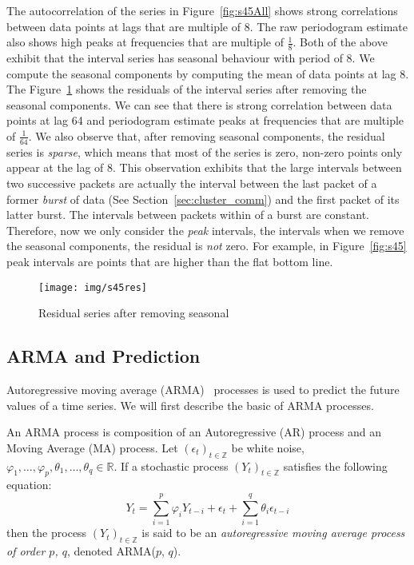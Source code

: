 \documentclass[12pt]{article}
\begin{document}
The autocorrelation of the series in Figure~\ref{fig:s45All} shows strong
correlations between data points at lags that are multiple of 8. The raw
periodogram estimate also shows high peaks at frequencies that are
multiple of $\frac{1}{8}$. Both of the above exhibit that the interval
series has seasonal behaviour with period of 8. We compute the seasonal
components by computing the mean of data points at lag 8. The
Figure~\ref{fig:s45res} shows the residuals of the interval series after
removing the seasonal components. We can see that there is strong correlation
between data points at lag 64 and periodogram estimate peaks at frequencies
that are multiple of $\frac{1}{64}$. We also observe that, after removing
seasonal components, the residual series is \textit{sparse}, which means that
most of the series is zero, non-zero points only appear at the lag of 8. This
observation exhibits that the large intervals between two successive packets are
actually the interval between the last packet of a former \textit{burst} of data
(See Section~\ref{sec:cluster_comm}) and the first packet of its latter burst.
The intervals between packets within of a burst are constant. Therefore, now we
only consider the \textit{peak} intervals, the intervals when we remove
the seasonal components, the residual is \textit{not} zero. For example, in
Figure~\ref{fig:s45} peak intervals are points that are higher than the flat
bottom line.

\begin{figure}[ht!]
\centering
\texttt{[image: img/s45res]}
\caption{Residual series after removing seasonal}\label{fig:s45res}
\end{figure}



\subsection{ARMA and Prediction}
Autoregressive moving average (ARMA)~\cite{BoxTimeSeries, FalkStatSAS}
 processes is used to predict the future values of a time series. We will first
 describe the basic of ARMA processes.
 
 An ARMA process is composition of an Autoregressive (AR) process and an Moving
 Average (MA) process. Let $(\epsilon_t)_{t\in \mathbb{Z}}$ be white noise,
 $\varphi_1, \ldots, \varphi_p, \theta_1, \ldots, \theta_q\in\mathbb{R}$. If a
stochastic process $(Y_t)_{t\in \mathbb{Z}}$ satisfies the following
 equation:
 \begin{equation}\label{eqn:ARMA}
 Y_t=\sum_{i=1}^{p}\varphi_iY_{t-i}+
 \epsilon_t +\sum_{i=1}^{q}\theta_i\epsilon_{t-i}
 \end{equation}
then the process $(Y_t)_{t\in \mathbb{Z}}$ is said to be
an \textit{autoregressive moving average process of order $p$, $q$}, denoted
ARMA($p$, $q$).
\end{document}

